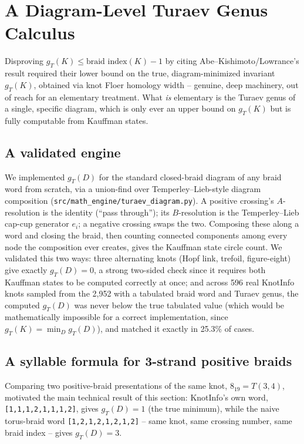 \documentclass[11pt]{article}
\theoremstyle{definition}
\begin{document}
\section{A Diagram-Level Turaev Genus Calculus}
\label{sec:calculus}

Disproving $g_T(K) \leq \text{braid index}(K) - 1$ by citing Abe--Kishimoto/Lowrance's result required their lower bound on the true, diagram-minimized invariant $g_T(K)$, obtained via knot Floer homology width -- genuine, deep machinery, out of reach for an elementary treatment. What \emph{is} elementary is the Turaev genus of a single, specific diagram, which is only ever an upper bound on $g_T(K)$ but is fully computable from Kauffman states.

\subsection{A validated engine}

We implemented $g_T(D)$ for the standard closed-braid diagram of any braid word from scratch, via a union-find over Temperley--Lieb-style diagram composition (\texttt{src/math\_engine/turaev\_diagram.py}). A positive crossing's $A$-resolution is the identity (``pass through''); its $B$-resolution is the Temperley--Lieb cap-cup generator $e_i$; a negative crossing swaps the two. Composing these along a word and closing the braid, then counting connected components among every node the composition ever creates, gives the Kauffman state circle count. We validated this two ways: three alternating knots (Hopf link, trefoil, figure-eight) give exactly $g_T(D) = 0$, a strong two-sided check since it requires both Kauffman states to be computed correctly at once; and across 596 real KnotInfo knots sampled from the 2{,}952 with a tabulated braid word and Turaev genus, the computed $g_T(D)$ was never below the true tabulated value (which would be mathematically impossible for a correct implementation, since $g_T(K) = \min_D g_T(D)$), and matched it exactly in 25.3\% of cases.

\subsection{A syllable formula for 3-strand positive braids}

Comparing two positive-braid presentations of the same knot, $8_{19} = T(3,4)$, motivated the main technical result of this section: KnotInfo's own word, \texttt{[1,1,1,2,1,1,1,2]}, gives $g_T(D) = 1$ (the true minimum), while the naive torus-braid word \texttt{[1,2,1,2,1,2,1,2]} -- same knot, same crossing number, same braid index -- gives $g_T(D) = 3$.
\end{document}
